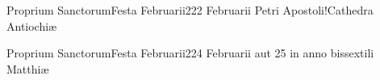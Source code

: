 \documentclass[psalterium-dominicis.tex]{subfiles}
\begin{document}
	{Proprium Sanctorum}{Festa Februarii}{2}{22 Februarii}
	{}{}{Petri Apostoli!Cathedra Antiochiæ}
	{}
	{}

	{Proprium Sanctorum}{Festa Februarii}{2}{24 Februarii aut 25 in anno bissextili}
	{}{}{Matthiæ}
	{}
	{}
\end{document}
